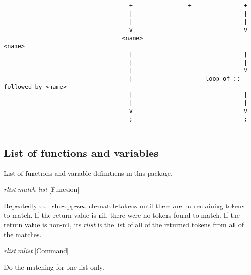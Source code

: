 {\begin{verbatim}
                                    +----------------+---------------+
                                    |                                |
                                    |                                |
                                    V                                V
                                  <name>                           <name>
                                    |                                |
                                    |                                |
                                    |                                V
                                    |                     loop of :: followed by <name>
                                    |                                |
                                    |                                |
                                    V                                V
                                    ;                                ;


\end{verbatim}}


\subsection{List of functions and variables}

List of functions and variable definitions in this package.



\vspace{1em}
\noindent
{}
\usebox{\funcname}\emph{rlist} \emph{match-list}
 \hfill [Function]
\hspace*{\wd\funcname}

\begin{doc-string}
Repeatedly call shu-cpp-search-match-tokens until there are no remaining tokens
to match.  If the return value is nil, there were no tokens found to match.  If
the return value is non-nil, its \emph{rlist} is the list of all of the returned tokens
from all of the matches.
\end{doc-string}

\vspace{1em}
\noindent
{}
\usebox{\funcname}\emph{rlist} \emph{mlist}
 \hfill [Command]
\hspace*{\wd\funcname}

\begin{doc-string}
Do the matching for one list only.
\end{doc-string}

